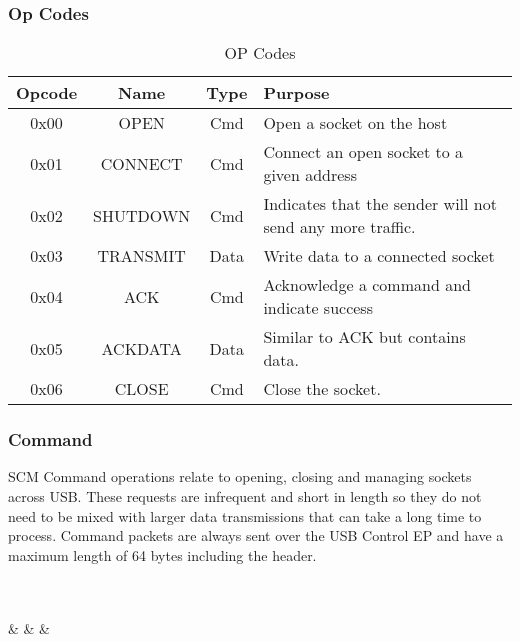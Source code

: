 \documentclass[10pt]{article}
\begin{document}
	\subsubsection{Op Codes}
	\begin{table}[h!]
		\begin{center}
			\caption{OP Codes}
			\label{tab:table1}
			\begin{tabular}{c|c|c|l} 
				\rowcolor{lightgray}
				\textbf{Opcode} &	\textbf{Name} &	\textbf{Type} & \textbf{Purpose}\\
				\hline
				0x00 & OPEN & Cmd & Open a socket on the host\\
				0x01 & CONNECT & Cmd & Connect an open socket to a given address\\
				0x02 & SHUTDOWN & Cmd & Indicates that the sender will not send any more traffic.\\
				0x03 & TRANSMIT & Data & Write data to a connected socket\\
				0x04 & ACK	& Cmd & Acknowledge a command and indicate success\\
				0x05 & ACKDATA	& Data & Similar to ACK but contains data. \\
				0x06 & CLOSE	& Cmd & Close the socket. \\
			\end{tabular}
		\end{center}
	\end{table}

	\subsubsection{Command}
	SCM Command operations relate to opening, closing and managing sockets across USB. These requests are infrequent and short in length so they do not need to be mixed with larger data transmissions that can take a long time to process. Command packets are always sent over the USB Control EP and have a maximum length of 64 bytes including the header.\\
	\\
	\begin{bytefield}[bitwidth=1.7em]{32}
		 \\
		 &
		 &
		 &
		 \\
		 \\
	\end{bytefield}\\ 
\end{document}
